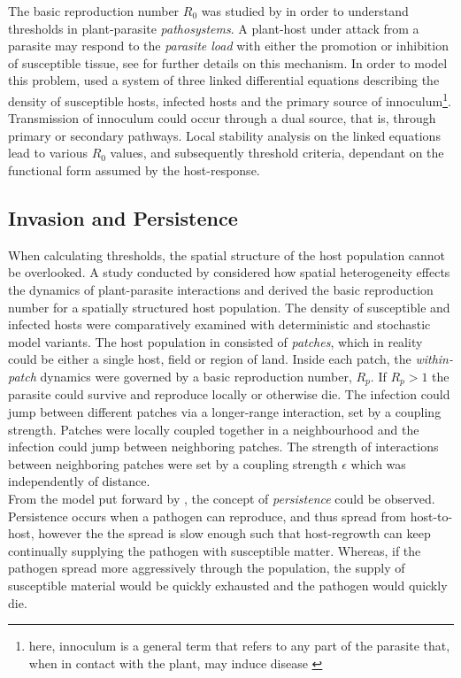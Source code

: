 The basic reproduction number $R_0$ was studied by \cite{gubbins2000population} in order to understand thresholds in plant-parasite \textit{pathosystems}. A plant-host under attack from a parasite may respond to the \textit{parasite load} with either the promotion or inhibition of susceptible tissue, see \cite{gilligan1997analysis} for further details on this mechanism. In order to model this problem, \cite{gubbins2000population} used a system of three linked differential equations describing the density of susceptible hosts, infected hosts and the primary source of innoculum\footnote{\textemdash here, innoculum is a general term that refers to any part of the parasite that, when in contact with the plant, may induce disease \cite{agrios2005chapter}}. Transmission of innoculum could occur through a dual source, that is, through primary or secondary pathways. Local stability analysis on the linked equations lead to various $R_0$ values, and subsequently threshold criteria, dependant on the functional form assumed by the host-response.\\

\subsection{Invasion and Persistence}
\label{ch3:invasions_and_persistence}
When calculating thresholds, the spatial structure of the host population cannot be overlooked. A study conducted by \cite{park2001invasion} considered how spatial heterogeneity effects the dynamics of plant-parasite interactions and derived the basic reproduction number for a spatially structured host population. The density of susceptible and infected hosts were comparatively examined with deterministic and stochastic model variants. The host population in \cite{park2001invasion} consisted of \textit{patches}, which in reality could be either a single host, field or region of land. Inside each patch, the \textit{within-patch} dynamics were governed by a basic reproduction number, $R_p$. If $R_p > 1$ the parasite could survive and reproduce locally or otherwise die. The infection could jump between different patches via a longer-range interaction, set by a coupling strength. Patches were locally coupled together in a neighbourhood and the infection could jump between neighboring patches. The strength of interactions between neighboring patches were set by a coupling strength $\epsilon$ which was independently of distance.\\

From the model put forward by \cite{park2001invasion}, the concept of \textit{persistence} could be observed. Persistence occurs when a pathogen can reproduce, and thus spread from host-to-host, however the the spread is slow enough such that host-regrowth can keep continually supplying the pathogen with susceptible matter. Whereas, if the pathogen spread more aggressively through the population, the supply of susceptible material would be quickly exhausted and the pathogen would quickly die.\\


